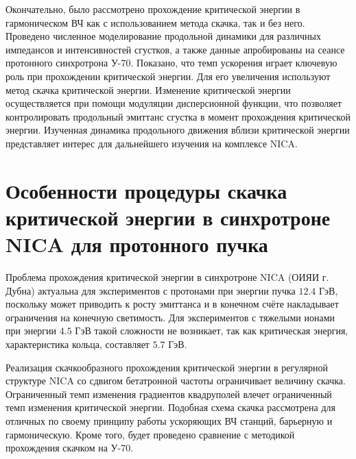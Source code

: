 \par Окончательно, было рассмотрено прохождение критической энергии в гармоническом ВЧ как с использованием метода скачка, так и без него. Проведено численное моделирование продольной динамики для различных импедансов и интенсивностей сгустков, а также данные апробированы на сеансе протонного синхротрона У-70. Показано, что темп ускорения играет ключевую роль при прохождении критической энергии. Для его увеличения используют метод скачка критической энергии. Изменение критической энергии осуществляется при помощи модуляции дисперсионной функции, что позволяет контролировать продольный эмиттанс сгустка в момент прохождения критической энергии. Изученная динамика продольного движения вблизи критической энергии представляет интерес для дальнейшего изучения на комплексе NICA.

\section{Особенности процедуры скачка критической энергии в синхротроне NICA для протонного пучка}

\par Проблема прохождения критической энергии в синхротроне NICA (ОИЯИ г. Дубна) актуальна для экспериментов с протонами при энергии пучка $12.4$ ГэВ, поскольку может приводить к росту эмиттанса и в конечном счёте накладывает ограничения на конечную светимость. Для экспериментов с тяжелыми ионами при энергии $4.5$ ГэВ такой сложности не возникает, так как критическая энергия, характеристика кольца, составляет $5.7$ ГэВ. 

\par Реализация скачкообразного прохождения критической энергии в регулярной структуре NICA со сдвигом бетатронной частоты ограничивает величину скачка. Ограниченный темп изменения градиентов квадруполей влечет ограниченный темп изменения критической энергии. Подобная схема скачка рассмотрена для отличных по своему принципу работы ускоряющих ВЧ станций, барьерную и гармоническую. Кроме того, будет проведено сравнение с методикой прохождения скачком на У-70.

